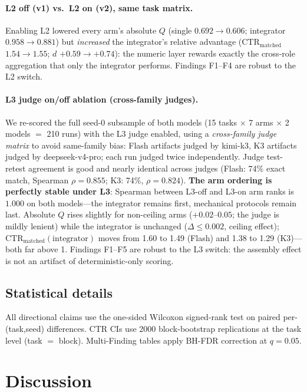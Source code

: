 \documentclass{article}
\newcommand{\ctrm}{\mathrm{CTR}_{\text{matched}}}
\begin{document}
\paragraph{L2 off (v1) vs.\ L2 on (v2), same task matrix.} Enabling L2 lowered every arm's absolute $Q$ (single $0.692 \to 0.606$; integrator $0.958 \to 0.881$) but \emph{increased} the integrator's relative advantage ($\ctrm$ $1.54 \to 1.55$; $d$ $+0.59 \to +0.74$): the numeric layer rewards exactly the cross-role aggregation that only the integrator performs. Findings F1--F4 are robust to the L2 switch.

\paragraph{L3 judge on/off ablation (cross-family judges).}
We re-scored the full seed-0 subsample of both models (15 tasks $\times$ 7 arms $\times$ 2 models $=$ 210 runs) with the L3 judge enabled, using a \emph{cross-family judge matrix} to avoid same-family bias: Flash artifacts judged by kimi-k3, K3 artifacts judged by deepseek-v4-pro; each run judged twice independently. Judge test-retest agreement is good and nearly identical across judges (Flash: 74\% exact match, Spearman $\rho = 0.855$; K3: 74\%, $\rho = 0.824$). \textbf{The arm ordering is perfectly stable under L3}: Spearman between L3-off and L3-on arm ranks is $1.000$ on both models---the integrator remains first, mechanical protocols remain last. Absolute $Q$ rises slightly for non-ceiling arms ($+0.02$--$0.05$; the judge is mildly lenient) while the integrator is unchanged ($\Delta \le 0.002$, ceiling effect); $\ctrm(\text{integrator})$ moves from 1.60 to 1.49 (Flash) and 1.38 to 1.29 (K3)---both far above 1. Findings F1--F5 are robust to the L3 switch: the assembly effect is not an artifact of deterministic-only scoring.

\subsection{Statistical details}
\label{sec:stats}

All directional claims use the one-sided Wilcoxon signed-rank test on paired per-(task,seed) differences. CTR CIs use 2000 block-bootstrap replications at the task level (task $=$ block). Multi-Finding tables apply BH-FDR correction at $q=0.05$.

\section{Discussion}
\label{sec:discussion}
\end{document}
